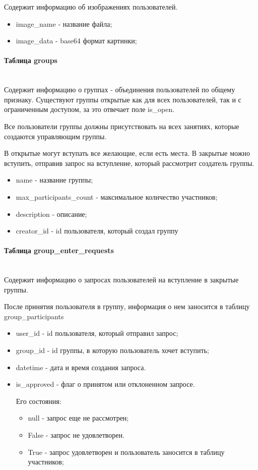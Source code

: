 \documentclass{disser}
\newcommand{\myparagraph}[1]{\paragraph{#1}\mbox{}\\}
\begin{document}
Содержит информацию об изображениях пользователей.

\begin{itemize}
    \item image\_name - название файла;
    \item image\_data - base64 формат картинки;
\end{itemize}

\myparagraph{Таблица groups}

Содержит информацию о группах - объединения пользователей по общему признаку. Существуют группы открытые как для всех пользователей, так и с ограниченным доступом, за это отвечает поле is\_open.

Все пользователи группы должны присутствовать на всех занятиях, которые создаются управляющим группы.

В открытые могут вступать все желающие, если есть места. 
В закрытые можно вступить, отправив запрос на вступление, который рассмотрит создатель группы.

\begin{itemize}
    \item name - название группы;
    \item max\_participants\_count - максимальное количество участников;
    \item description - описание;
    \item creator\_id - id пользователя, который создал группу
\end{itemize}

\myparagraph{Таблица group\_enter\_requests}

Содержит информацию о запросах пользователей на вступление в закрытые группы.

После принятия пользователя в группу, информация о нем заносится в таблицу group\_participants

\begin{itemize}
    \item user\_id - id пользователя, который отправил запрос;
    \item group\_id - id группы, в которую пользователь хочет вступить;
    \item datetime - дата и время создания запроса.
    \item is\_approved - флаг о принятом или отклоненном запросе. 
    
    Его состояния: 
        \begin{itemize}
            \item null - запрос еще не рассмотрен;
            \item False - запрос не удовлетворен.
            \item True - запрос удовлетворен и пользователь заносится в таблицу участников;
        \end{itemize}
\end{itemize}
\end{document}
